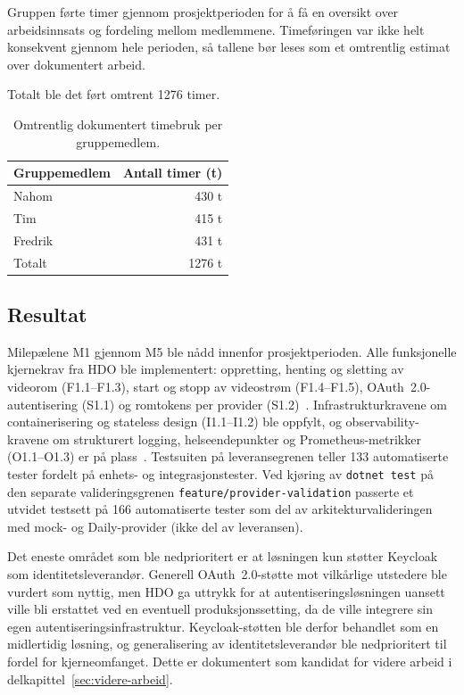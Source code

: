 Gruppen førte timer gjennom prosjektperioden for å få en oversikt over arbeidsinnsats
og fordeling mellom medlemmene. Timeføringen var ikke helt konsekvent gjennom hele
perioden, så tallene bør leses som et omtrentlig estimat over dokumentert arbeid.

Totalt ble det ført omtrent 1276 timer.

\begin{table}[H]
\centering
\begin{tabular}{lr}
\toprule
Gruppemedlem & Antall timer (t) \\
\midrule
Nahom & 430 t \\
Tim & 415 t \\
Fredrik & 431 t \\
\midrule
Totalt & 1276 t \\
\bottomrule
\end{tabular}
\caption{Omtrentlig dokumentert timebruk per gruppemedlem.}
\label{tab:timebruk-medlem}
\end{table}

\subsection{Resultat}

Milepælene M1 gjennom M5 ble nådd innenfor prosjektperioden. Alle funksjonelle
kjernekrav fra HDO ble implementert: oppretting, henting og sletting av videorom
(F1.1–F1.3), start og stopp av videostrøm (F1.4–F1.5), OAuth~2.0-autentisering
(S1.1) og romtokens per provider (S1.2)~\cite{hdo_kravspec}.
Infrastrukturkravene om containerisering og stateless design (I1.1–I1.2) ble oppfylt,
og observability-kravene om strukturert logging, helseendepunkter og
Prometheus-metrikker (O1.1–O1.3) er på plass~\cite{hdo_kravspec}.
Testsuiten på leveransegrenen teller 133 automatiserte tester fordelt på enhets-
og integrasjonstester.
Ved kjøring av \texttt{dotnet test} på den separate valideringsgrenen
\texttt{feature/provider-validation} passerte et utvidet testsett på 166 automatiserte
tester som del av arkitekturvalideringen med mock- og Daily-provider (ikke del av
leveransen).

Det eneste området som ble nedprioritert er at løsningen
kun støtter Keycloak som identitetsleverandør. Generell OAuth~2.0-støtte mot vilkårlige
utstedere ble vurdert som nyttig, men HDO ga uttrykk for at autentiseringsløsningen
uansett ville bli erstattet ved en eventuell produksjonssetting, da de ville integrere
sin egen autentiseringsinfrastruktur. Keycloak-støtten ble derfor behandlet som en
midlertidig løsning, og generalisering av identitetsleverandør ble nedprioritert til
fordel for kjerneomfanget. Dette er dokumentert som kandidat for videre arbeid i
delkapittel~\ref{sec:videre-arbeid}.